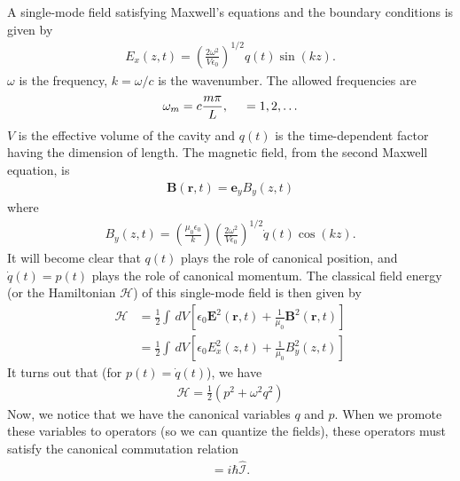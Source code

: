 \documentclass{book}
\theoremstyle{definition}
\newcommand{\ham}{\mathcal{H}}
\newcommand{\f}[2]{\frac{#1}{#2}}
\newcommand{\lp}{\left(}
\newcommand{\rp}{\right)}
\newcommand{\lb}{\left[}
\newcommand{\rb}{\right]}
\newcommand{\Id}{\mathcal{I}}
\begin{document}
A single-mode field satisfying Maxwell’s equations and the boundary conditions is given by
\begin{align}
E_x(z,t) = \lp \f{2\omega^2}{V\epsilon_0} \rp^{1/2} q(t)\sin(kz).
\end{align}
$\omega$ is the frequency, $k = \omega/c$ is the wavenumber. The allowed frequencies are
\begin{align}
\omega_m = c\f{m \pi}{L},\hspace{0.5cm}  =1,2,\dots
\end{align} 
$V$ is the effective volume of the cavity and $q(t)$ is the time-dependent factor having the dimension of length. The magnetic field, from the second Maxwell equation, is
\begin{align}
\mathbf{B}(\mathbf{r},t) = \mathbf{e}_yB_y(z,t)
\end{align}
where
\begin{align}
B_y(z,t) = \lp \f{\mu_0\epsilon_0}{k} \rp\lp \f{2\omega^2}{V\epsilon_0} \rp^{1/2}\dot{q}(t)\cos(kz).
\end{align}
It will become clear that $q(t)$ plays the role of canonical position, and $\dot{q}(t) = p(t)$ plays the role of canonical momentum. The classical field energy (or the Hamiltonian $\ham$) of this single-mode field is then given by
\begin{align}
\ham &= \f{1}{2}\int\,dV \lb \epsilon_0 \mathbf{E}^2(\mathbf{r},t) + \f{1}{\mu_0}\mathbf{B}^2(\mathbf{r},t) \rb\\
&= \f{1}{2}\int\,dV \lb \epsilon_0 E^2_x(z,t) + \f{1}{\mu_0}B_y^2(z,t) \rb
\end{align}
It turns out that (for $p(t) = \dot{q}(t)$), we have
\begin{align}
\boxed{\ham = \f{1}{2}\lp p^2 + \omega^2q^2 \rp}
\end{align} 
Now, we notice that we have the canonical variables $q$ and $p$. When we promote these variables to operators (so we can quantize the fields), these operators must satisfy the canonical commutation relation
\begin{align}
[\hat{q}, \hat{p}] = i\hbar \hat{\Id}.
\end{align}
\end{document}
